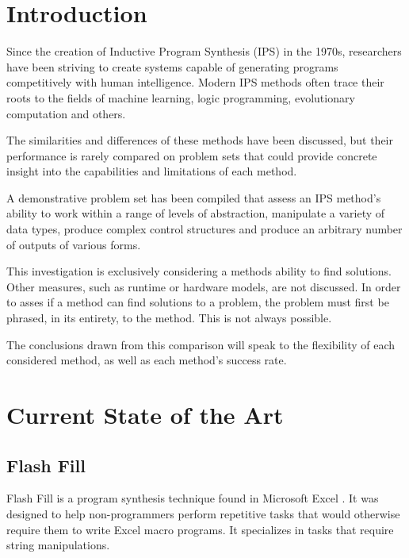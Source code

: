 \section{Introduction}

Since the creation of Inductive Program Synthesis (IPS) in the 1970s\cite{Kitzelmann2009}, researchers have been striving to create systems capable of generating programs competitively with human intelligence. Modern IPS methods often trace their roots to the fields of machine learning, logic programming, evolutionary computation and others.

The similarities and differences of these methods have been discussed\cite{Kitzelmann2009}, but their performance is rarely compared on problem sets that could provide concrete insight into the capabilities and limitations of each method.

A demonstrative problem set has been compiled that assess an IPS method's ability to work within a range of levels of abstraction\cite{Gaunt2016}, manipulate a variety of data types, produce complex control structures and produce an arbitrary number of outputs of various forms\cite{Helmuth2015b}.


This investigation is exclusively considering a methods ability to find solutions. Other measures, such as runtime or hardware models, are not discussed. In order to asses if a method can find solutions to a problem, the problem must first be phrased, in its entirety, to the method. This is not always possible.

The conclusions drawn from this comparison will speak to the flexibility of each considered method, as well as each method's success rate.

\section{Current State of the Art}

\subsection{Flash Fill}

Flash Fill is a program synthesis technique found in Microsoft Excel \cite{Gulwani2011}. It was designed to help non-programmers perform repetitive tasks that would otherwise require them to write Excel macro programs. It specializes in tasks that require string manipulations. 

